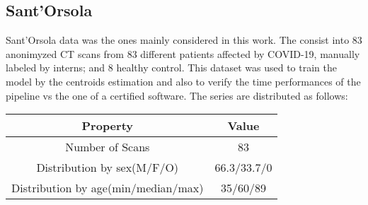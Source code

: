 \documentclass{standalone}
\begin{document}
	\subsection{Sant'Orsola}
	
	Sant'Orsola data was the ones mainly considered in this work. The consist into 83 anonimyzed CT scans from $83$ different patients affected by COVID-19, manually labeled by interns; and $8$ healthy control. This dataset was used to train the model by the centroids estimation and also to verify the time performances of the pipeline vs the one of a certified software.
	The series are distributed as follows: 
	\begin{table}[h!]
		\centering
		\begin{tabular}{|c|c|}
			\hline
					\textbf{Property}   		&	\textbf{Value} \\ \hline
					Number of Scans 			& 83			   \\ 
			Distribution by sex(M/F/O)  		& 66.3/33.7/0    \\
			Distribution by age(min/median/max) & 35/60/89	\\ \hline
		\end{tabular}
	\end{table}

	
\end{document}
